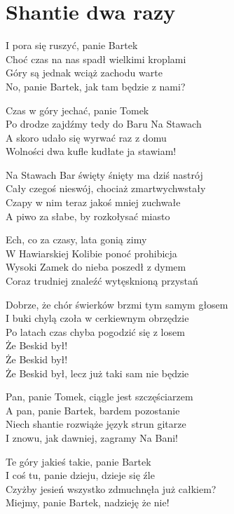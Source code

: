 \section{Shantie dwa razy}
\begin{text}
    I pora się ruszyć, panie Bartek\\
    Choć czas na nas spadł wielkimi kroplami\\
    Góry są jednak wciąż zachodu warte\\
    No, panie Bartek, jak tam będzie z nami?

    Czas w góry jechać, panie Tomek\\
    Po drodze zajdźmy tedy do Baru Na Stawach\\
    A skoro udało się wyrwać raz z domu\\
    Wolności dwa kufle kudłate ja stawiam!

    Na Stawach Bar święty śnięty ma dziś nastrój\\
    Cały czegoś nieswój, chociaż zmartwychwstały\\
    Czapy w nim teraz jakoś mniej zuchwałe\\
    A piwo za słabe, by rozkołysać miasto

    Ech, co za czasy, lata gonią zimy\\
    W Hawiarskiej Kolibie ponoć prohibicja\\
    Wysoki Zamek do nieba poszedł z dymem\\
    Coraz trudniej znaleźć wytęsknioną przystań

    Dobrze, że chór świerków brzmi tym samym głosem\\
    I buki chylą czoła w cerkiewnym obrzędzie\\
    Po latach czas chyba pogodzić się z losem\\
    Że Beskid był!\\
    Że Beskid był!\\
    Że Beskid był, lecz już taki sam nie będzie

    Pan, panie Tomek, ciągle jest szczęściarzem\\
    A pan, panie Bartek, bardem pozostanie\\
    Niech shantie rozwiąże język strun gitarze\\
    I znowu, jak dawniej, zagramy Na Bani!

    Te góry jakieś takie, panie Bartek\\
    I coś tu, panie dzieju, dzieje się źle\\
    Czyżby jesień wszystko zdmuchnęła już całkiem?\\
    Miejmy, panie Bartek, nadzieję że nie!


\end{text}
